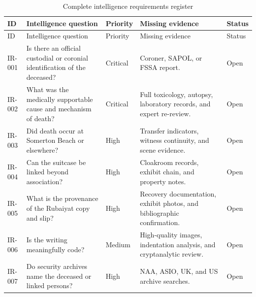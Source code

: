 \begingroup
\scriptsize
\setlength{\tabcolsep}{2pt}
\renewcommand{\arraystretch}{1.12}
\begin{longtable}{>{\raggedright\arraybackslash}p{}>{\raggedright\arraybackslash}p{}>{\raggedright\arraybackslash}p{}>{\raggedright\arraybackslash}p{}>{\raggedright\arraybackslash}p{}}
\caption{Complete intelligence requirements register}\label{tab:chapter11-intelligence-requirements}\\
\toprule
ID & Intelligence question & Priority & Missing evidence & Status \\
\midrule
\endfirsthead
\toprule
ID & Intelligence question & Priority & Missing evidence & Status \\
\midrule
\endhead
IR-001 & Is there an official custodial or coronial identification of the deceased? & Critical & Coroner, SAPOL, or FSSA report. & Open \\
IR-002 & What was the medically supportable cause and mechanism of death? & Critical & Full toxicology, autopsy, laboratory records, and expert re-review. & Open \\
IR-003 & Did death occur at Somerton Beach or elsewhere? & High & Transfer indicators, witness continuity, and scene evidence. & Open \\
IR-004 & Can the suitcase be linked beyond association? & High & Cloakroom records, exhibit chain, and property notes. & Open \\
IR-005 & What is the provenance of the Rubaiyat copy and slip? & High & Recovery documentation, exhibit photos, and bibliographic confirmation. & Open \\
IR-006 & Is the writing meaningfully code? & Medium & High-quality images, indentation analysis, and cryptanalytic review. & Open \\
IR-007 & Do security archives name the deceased or linked persons? & High & NAA, ASIO, UK, and US archive searches. & Open \\
\bottomrule
\end{longtable}
\endgroup

